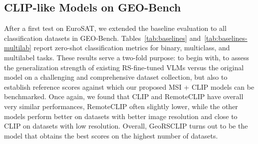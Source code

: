 \documentclass[a4paper, twoside, english]{sapthesis} %
\begin{document}
\subsection{CLIP-like Models on GEO-Bench}

After a first test on EuroSAT, we extended the baseline evaluation to all classification datasets in GEO-Bench. Tables~\ref{tab:baselines} and~\ref{tab:baselines-multilab} report zero-shot classification metrics for binary, multiclass, and multilabel tasks. 
These results serve a two-fold purpose: to begin with, to assess the generalization strength of existing RS-fine-tuned VLMs versus the original model on a challenging and comprehensive dataset collection, but also to establish reference scores against which our proposed MSI + CLIP models can be benchmarked. Once again, we found that CLIP and RemoteCLIP have overall very similar performances, RemoteCLIP often slightly lower, while the other models perform better on datasets with better image resolution and close to CLIP on datasets with low resolution. Overall, GeoRSCLIP turns out to be the model that obtains the best scores on the highest number of datasets.

\vspace{0.5cm}

\begin{table}[h]
\centering
\footnotesize
\renewcommand{\arraystretch}{1.2}
\vspace{0.3cm}
\caption{\normalsize Comparison of zero-shot accuracies obtained by different models across GEO-Bench datasets.}
\label{tab:baselines}
\end{table}
\end{document}
